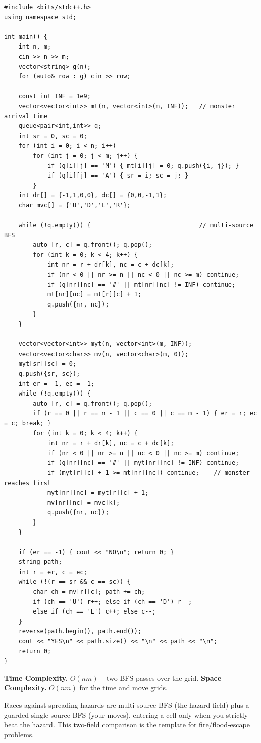 \begin{lstlisting}
#include <bits/stdc++.h>
using namespace std;

int main() {
    int n, m;
    cin >> n >> m;
    vector<string> g(n);
    for (auto& row : g) cin >> row;

    const int INF = 1e9;
    vector<vector<int>> mt(n, vector<int>(m, INF));   // monster arrival time
    queue<pair<int,int>> q;
    int sr = 0, sc = 0;
    for (int i = 0; i < n; i++)
        for (int j = 0; j < m; j++) {
            if (g[i][j] == 'M') { mt[i][j] = 0; q.push({i, j}); }
            if (g[i][j] == 'A') { sr = i; sc = j; }
        }
    int dr[] = {-1,1,0,0}, dc[] = {0,0,-1,1};
    char mvc[] = {'U','D','L','R'};

    while (!q.empty()) {                              // multi-source BFS
        auto [r, c] = q.front(); q.pop();
        for (int k = 0; k < 4; k++) {
            int nr = r + dr[k], nc = c + dc[k];
            if (nr < 0 || nr >= n || nc < 0 || nc >= m) continue;
            if (g[nr][nc] == '#' || mt[nr][nc] != INF) continue;
            mt[nr][nc] = mt[r][c] + 1;
            q.push({nr, nc});
        }
    }

    vector<vector<int>> myt(n, vector<int>(m, INF));
    vector<vector<char>> mv(n, vector<char>(m, 0));
    myt[sr][sc] = 0;
    q.push({sr, sc});
    int er = -1, ec = -1;
    while (!q.empty()) {
        auto [r, c] = q.front(); q.pop();
        if (r == 0 || r == n - 1 || c == 0 || c == m - 1) { er = r; ec = c; break; }
        for (int k = 0; k < 4; k++) {
            int nr = r + dr[k], nc = c + dc[k];
            if (nr < 0 || nr >= n || nc < 0 || nc >= m) continue;
            if (g[nr][nc] == '#' || myt[nr][nc] != INF) continue;
            if (myt[r][c] + 1 >= mt[nr][nc]) continue;    // monster reaches first
            myt[nr][nc] = myt[r][c] + 1;
            mv[nr][nc] = mvc[k];
            q.push({nr, nc});
        }
    }

    if (er == -1) { cout << "NO\n"; return 0; }
    string path;
    int r = er, c = ec;
    while (!(r == sr && c == sc)) {
        char ch = mv[r][c]; path += ch;
        if (ch == 'U') r++; else if (ch == 'D') r--;
        else if (ch == 'L') c++; else c--;
    }
    reverse(path.begin(), path.end());
    cout << "YES\n" << path.size() << "\n" << path << "\n";
    return 0;
}
\end{lstlisting}

\begin{complexitybox}
\textbf{Time Complexity.} $O(nm)$ -- two BFS passes over the grid.
\textbf{Space Complexity.} $O(nm)$ for the time and move grids.
\end{complexitybox}

\begin{takeawaybox}
Races against spreading hazards are multi-source BFS (the hazard field)
plus a guarded single-source BFS (your moves), entering a cell only when
you strictly beat the hazard. This two-field comparison is the template for
fire/flood-escape problems.
\end{takeawaybox}
